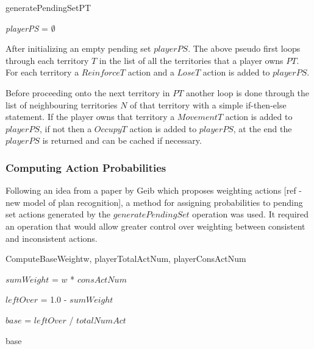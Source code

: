 \documentclass[parskip]{cs4rep}
\begin{document}
\begin{pseudocode}[ruled]{generatePendingSet}{PT}
\begin{algorithm}[H]
\textit{playerPS} = $\emptyset$

\end{algorithm}
\end{pseudocode}

After initializing an empty pending set $playerPS$. The above pseudo first loops through each territory $T$ in the list of all the territories that a player owns $PT$. For each territory a $ReinforceT$ action and a $LoseT$ action is added to $playerPS$. 

Before proceeding onto the next territory in $PT$ another loop is done through the list of neighbouring territories $N$ of that territory with a simple if-then-else statement. If the player owns that territory a $MovementT$ action is added to $playerPS$, if not then a $OccupyT$ action is added to $playerPS$, at the end the $playerPS$ is returned and can be cached if necessary.

\newpage

\subsubsection{Computing Action Probabilities}

Following an idea from a paper by Geib which proposes weighting actions [ref - new model of plan recognition], a method for assigning probabilities to pending set actions generated by the $generatePendingSet$ operation was used. It required an operation that would allow greater control over weighting between consistent and inconsistent actions.

\begin{pseudocode}[ruled]{ComputeBaseWeight}{w, playerTotalActNum, playerConsActNum}
\begin{algorithm}[H]

$sumWeight$ = $w$ * $consActNum$

$leftOver$ = 1.0 - $sumWeight$

$base$ = $leftOver$ / $totalNumAct$

\Return base
\end{algorithm}
\end{pseudocode}
\end{document}
